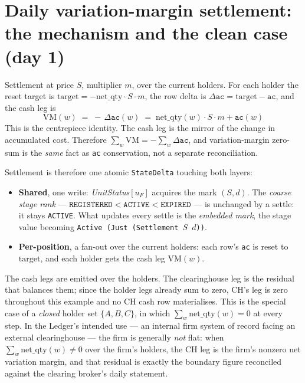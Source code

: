 \documentclass[11pt]{article}
\newcommand{\ac}{\texttt{ac}}
\newcommand{\netq}{\mathrm{net\_qty}}
\newcommand{\code}[1]{\texttt{#1}}
\newcommand{\unit}{u_{F}}
\newcommand{\mult}{m}
\begin{document}
\section{Daily variation-margin settlement: the mechanism and the clean case (day 1)}
\label{sec:settle-mech}

Settlement at price $S$, multiplier $\mult$, over the current holders. For each holder the reset
target is $\mathrm{target}=-\netq\cdot S\cdot\mult$, the row delta is
$\Delta\ac=\mathrm{target}-\ac$, and the cash leg is
\[
\boxed{\;\mathrm{VM}(w) \;=\; -\,\Delta\ac(w) \;=\; \netq(w)\cdot S\cdot \mult + \ac(w)\;}
\]
This is the centrepiece identity. The cash leg is the mirror of the change in accumulated cost.
Therefore $\sum_w\mathrm{VM} = -\sum_w\Delta\ac$, and variation-margin zero-sum is the \emph{same}
fact as \ac{} conservation, not a separate reconciliation.

Settlement is therefore one atomic \code{StateDelta} touching both layers:
\begin{itemize}
\item \textbf{Shared}, one write: \emph{UnitStatus}$[\unit]$ acquires the mark $(S,d)$. The
\emph{coarse stage rank} --- $\code{REGISTERED}<\code{ACTIVE}<\code{EXPIRED}$ --- is unchanged by a
settle: it stays \code{ACTIVE}. What updates every settle is the \emph{embedded mark}, the stage
value becoming \code{Active (Just (Settlement $S$ $d$))}.
\item \textbf{Per-position}, a fan-out over the current holders: each row's \ac{} is reset to
$\mathrm{target}$, and each holder gets the cash leg $\mathrm{VM}(w)$.
\end{itemize}

\noindent The cash legs are emitted over the holders. The clearinghouse leg is the residual that
balances them; since the holder legs already sum to zero, CH's leg is zero throughout this example
and no CH cash row materialises. This is the special case of a \emph{closed} holder set $\{A,B,C\}$, in
which $\sum_w\netq(w)=0$ at every step. In the Ledger's intended use --- an internal firm system of
record facing an external clearinghouse --- the firm is generally \emph{not} flat: when
$\sum_w\netq(w)\ne 0$ over the firm's holders, the CH leg is the firm's nonzero net variation margin,
and that residual is exactly the boundary figure reconciled against the clearing broker's daily
statement.
\end{document}
